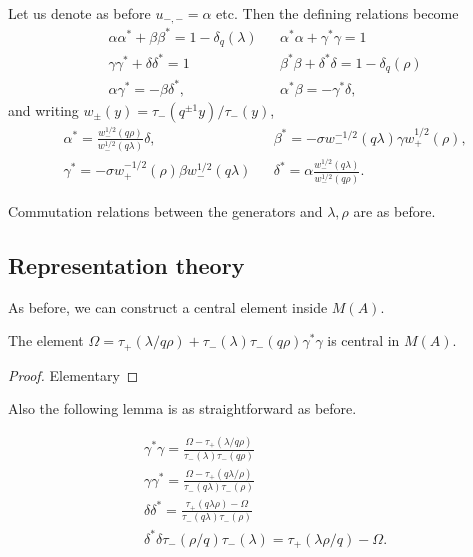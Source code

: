 Let us denote as before $u_{-,-}=\alpha$ etc. Then the defining relations become \begin{align*}  &\alpha \alpha^* +\beta\beta^* = 1-\delta_q(\lambda) && \alpha^*\alpha + \gamma^* \gamma = 1\\ &\gamma \gamma^* + \delta\delta^* = 1 && \beta^* \beta +\delta^*\delta =1-\delta_q(\rho)\\ & \alpha \gamma^* = -\beta \delta^*, && \alpha^* \beta = -\gamma^* \delta,\end{align*} and writing $w_{\pm}(y) = \tau_-(q^{\pm 1}y)/\tau_-(y)$, \begin{align*} & \alpha^* =  \frac{w_-^{1/2}(q\rho)}{w_-^{1/2}(q\lambda)}\delta,&& \beta^* =-\sigma w_-^{-1/2}(q\lambda)\gamma w_+^{1/2}(\rho),\\ &\gamma^* = -\sigma w_+^{-1/2}(\rho)\beta w_-^{1/2}(q\lambda) && \delta^* = \alpha \frac{w_-^{1/2}(q\lambda)}{w_-^{1/2}(q\rho)}.\end{align*} 

Commutation relations between the generators and $\lambda,\rho$ are as before.

\subsection{Representation theory}

As before, we can construct a central element inside $M(A)$.

\begin{Lem} The element $\Omega = \tau_+(\lambda/q\rho)+\tau_-(\lambda)\tau_-(q\rho)\gamma^*\gamma$ is central in $M(A)$.
\end{Lem}
\begin{proof} Elementary
\end{proof}

Also the following lemma is as straightforward as before.

\begin{Lem}  \begin{align*} &\gamma^*\gamma = \frac{\Omega - \tau_+(\lambda/q\rho)}{\tau_-(\lambda)\tau_-(q\rho)} \\ &\gamma \gamma^* = \frac{\Omega- \tau_+(q\lambda/\rho)}{\tau_-(q\lambda)\tau_-(\rho)} \\ &\delta \delta^* = \frac{\tau_+(q\lambda\rho)-\Omega}{\tau_-(q\lambda)\tau_-(\rho)} \\ & \delta^*\delta \tau_-(\rho/q)\tau_-(\lambda) = \tau_+(\lambda\rho/q)-\Omega.\end{align*}
\end{Lem} 

